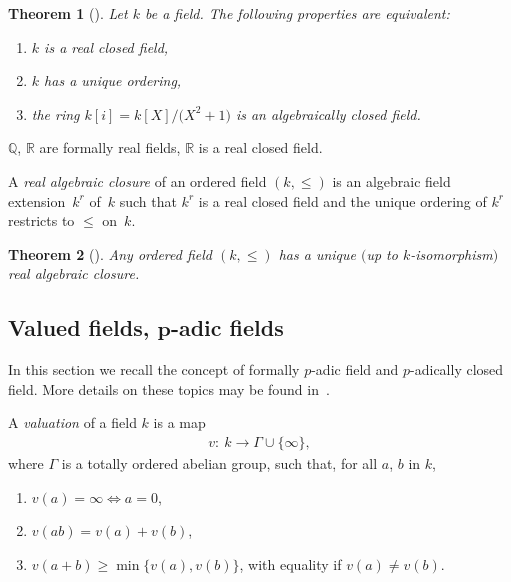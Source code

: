 \documentclass[pdftex]{sigma}%
\numberwithin{equation}{section}
\newtheorem{Theorem}{Theorem}[section]
\newcommand{\R}{\mathbb{R}}
\newcommand{\Q}{\mathbb{Q}}
\begin{document}
\begin{Theorem}[{\cite[Theorem~1.2.2]{BCR}}]\label{realcl}
Let $k$ be a field. The following properties are equivalent:
\begin{enumerate}\itemsep=0pt
\item[$(i)$] $k$ is a real closed field,
\item[$(ii)$] $k$ has a unique ordering,
\item[$(iii)$] the ring $k[i]=k[X]/\big(X^2+1\big)$ is an algebraically closed field.
\end{enumerate}
\end{Theorem}

\begin{examples} $\Q$, $\R$ are formally real fields, $\R$ is a real closed field.
\end{examples}

\begin{Definition} A \emph{real algebraic closure} of an ordered field $(k,\leq)$ is an algebraic field extension~$k^r$ of~$k$ such that $k^r$ is a real closed field and the unique ordering of $k^r$ restricts to $\leq$ on~$k$.
\end{Definition}

\begin{Theorem}[{\cite[Theorem~3.10]{Pre}}] Any ordered field $(k,\leq)$ has a
unique $($up to $k$-isomorphism$)$ real algebraic closure.
\end{Theorem}

\subsection[Valued fields, p-adic fields]{Valued fields, $\boldsymbol p$-adic fields}

In this section we recall the concept of formally $p$-adic field and $p$-adically closed field. More details on these topics may be found in~\cite{PR}.

\begin{Definition} A \emph{valuation} of a field $k$ is a map
\begin{gather*}
v\colon\ k \rightarrow \Gamma \cup \{ \infty \},
\end{gather*}
where $\Gamma$ is a totally ordered abelian group, such that, for all $a$, $b$ in $k$,
\begin{enumerate}\itemsep=0pt
\item[$(1)$] $v(a)=\infty \Leftrightarrow a=0$,
\item[$(2)$] $v(ab)=v(a)+v(b)$,
\item[$(3)$] $v(a+b) \geq \min \{v(a),v(b)\}$, with equality if $v(a)\neq v(b)$.
\end{enumerate}
\end{Definition}
\end{document}
